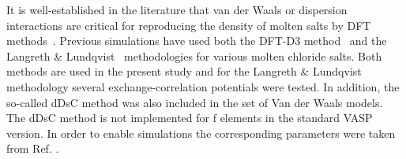 \documentclass[preprint,3p,10pt,twocolumn,number,sort&compress]{elsarticle}
\begin{document}
It is well-established in the literature that van der Waals or dispersion interactions are critical for reproducing the density of molten salts by DFT methods~\cite{}. Previous simulations have used both the DFT-D3 method~\cite{} and the Langreth \& Lundqvist~\cite{} methodologies for various molten chloride salts. Both methods are used in the present study and for the Langreth \& Lundqvist~\cite{}  methodology several exchange-correlation potentials were tested. In addition, the so-called dDsC method was also included in the set of Van der Waals models. The dDsC method is not implemented for f elements in the standard VASP version. In order to enable simulations the corresponding parameters were taken from Ref. \cite{}. 
\end{document}
